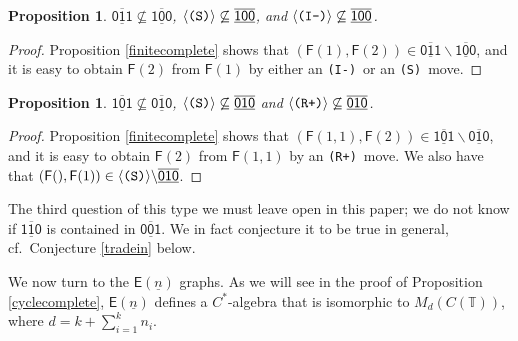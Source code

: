 \documentclass[12pt]{amsbook}%
\newtheorem{propo}[theor]{Proposition}
\theoremstyle{defin}
\theoremstyle{remark}
\numberwithin{equation}{chapter}
\numberwithin{theor}{section}
\newcommand{\nn}{\underline{n}}
\newcommand{\TT}{\mathbb{T}}
\newcommand{\xyzrel}[1]{\mbox{$\overline{\underline{\mathsf{ #1}}}$}}
\newcommand{\IIIm}{\mbox{\texttt{\textup{(I-)}}}}
\newcommand{\RRRp}{\mbox{\texttt{\textup{(R+)}}}}
\newcommand{\SSS}{\mbox{\texttt{\textup{(S)}}}}
\newcommand{\GF}{{\mathsf F}}
\newcommand{\GC}{{\mathsf E}}
\begin{document}
\begin{propo}\label{OIIniIOO} $\xyzrel{011}\not\subseteq \xyzrel{100}$, $\langle\SSS\rangle \not\subseteq \xyzrel{100}$, and $\langle\IIIm\rangle \not\subseteq \xyzrel{100}$.
\end{propo}
\begin{proof} Proposition \ref{finitecomplete} shows that $(\GF(1),\GF(2))\in \xyzrel{011}\backslash \xyzrel{100}$, and it is easy to obtain $\GF(2)$ from $\GF(1)$ by either an \IIIm\ or an \SSS\ move.
\end{proof}

\begin{propo}\label{IOIniOIO} $\xyzrel{101}\not\subseteq \xyzrel{010}$, $\langle\SSS\rangle \not\subseteq \xyzrel{010}$ and $\langle \RRRp\rangle \not\subseteq \xyzrel{010}$.
\end{propo}
\begin{proof} Proposition \ref{finitecomplete} shows that $(\GF(1,1),\GF(2))\in \xyzrel{101}\backslash \xyzrel{010}$, and it is easy to obtain  $\GF(2)$ from $\GF(1,1)$ by an \RRRp\ move. We also have that $(\GF(),\GF(1))\in \langle \SSS\rangle\backslash \xyzrel{010}$.
\end{proof}

The third question of this type we must leave open in this paper; we do not know if $\xyzrel{110}$ is contained in $\xyzrel{001}$. We in fact conjecture it to be true in general, cf.~Conjecture \ref{tradein} below.


 
  
We now turn to the $\GC(\nn)$ graphs.  As we will see in the proof of Proposition \ref{cyclecomplete}, $\GC(\nn)$ defines a $C^*$-algebra that is isomorphic to $M_d(C(\TT))$, where $d = k + \sum_{ i = 1}^k n_i$.


\end{document}
